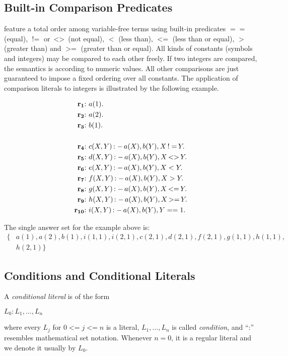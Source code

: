 \documentclass[a4paper, titlepage]{article}
\DeclareMathOperator{\leftimpl}{:-}
\DeclareMathOperator{\noteq}{!=}
\DeclareMathOperator{\noteqq}{<>}
\DeclareMathOperator{\lesseq}{<=}
\DeclareMathOperator{\geeq}{>=}
\newcommand\mycenterline[1]{\par\smallskip\centerline{#1} \smallskip}
\newcommand{\rowprefix}[1]{%
  \ensuremath{\color{black}\mathbf{#1{:}}\ }%
}
\begin{document}
\subsection{Built-in Comparison Predicates}
\dlvhex{} feature a total order among variable-free terms 
using built-in predicates $==$ (equal), $\noteq$ or $\noteqq$ (not equal), 
$<$ (less than), $\lesseq$ (less than or equal), $>$ (greater 
than) and $\geeq$ (greater than or equal). All kinds of 
constants (symbols and integers) may be compared to 
each other freely. If two integers are compared, the 
semantics is according to numeric values. All other 
comparisons are just guaranteed to impose a fixed ordering 
over all constants. The application of comparison literals 
to integers is illustrated by the following example.
\begin{exmp}
\begin{align*}
\rowprefix{r_1}& a(1). \\
\rowprefix{r_2}& a(2). \\
\rowprefix{r_3}& b(1). \\
\\
\rowprefix{r_4}& c(X,Y) \leftimpl a(X), b(Y), X \noteq Y. \\
\rowprefix{r_5}& d(X,Y) \leftimpl a(X), b(Y), X \noteqq Y. \\
\rowprefix{r_6}& e(X,Y) \leftimpl a(X), b(Y), X < Y. \\
\rowprefix{r_7}& f(X,Y) \leftimpl a(X), b(Y), X > Y. \\
\rowprefix{r_8}& g(X,Y) \leftimpl a(X), b(Y), X \lesseq Y. \\
\rowprefix{r_9}& h(X,Y) \leftimpl a(X), b(Y), X \geeq Y. \\
\rowprefix{r_{10}}& i(X,Y) \leftimpl a(X), b(Y), Y == 1. 
\end{align*}
\end{exmp}
The single answer set for the example above is:
\begin{align*}
\{ & \mathit{a(1),a(2),b(1),i(1,1),i(2,1),c(2,1),d(2,1),f(2,1),g(1,1),h(1,1)},\\
   & \mathit{h(2,1)}\}
\end{align*}

\subsection{Conditions and Conditional Literals}
\label{conditions}
A \emph{conditional literal} is of the form \\ 
\mycenterline{$L_0:L_1,\dots,L_n$} where every $\mathit{L_j}$ 
for $0 \lesseq j \lesseq n$ is a literal, $L_1,\dots,L_n$ is 
called \emph{condition}, and \enquote{:} resembles 
mathematical set notation. Whenever $\mathit{n = 0}$, it is 
a regular literal and we denote it usually by $L_0$.
\end{document}
